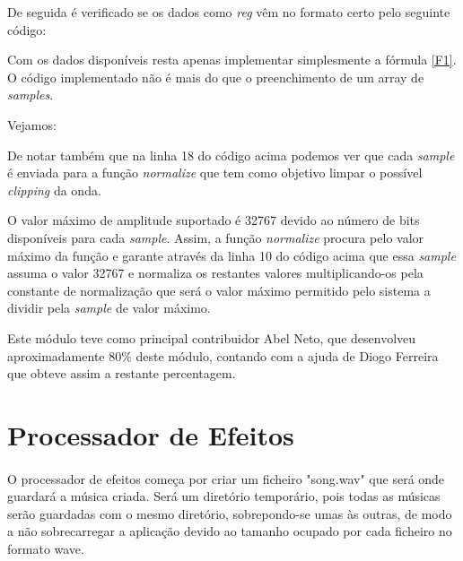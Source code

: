 \documentclass[11pt,openany,twoside]{report}
\begin{document}
De seguida é verificado se os dados como \textit{reg} vêm no formato certo pelo seguinte código:


Com os dados disponíveis resta apenas implementar simplesmente a fórmula \ref{F1}. O código implementado não é mais do que o preenchimento de um array de \textit{samples}. 

Vejamos:


De notar também que na linha 18 do código acima podemos ver que cada \textit{sample} é enviada para a função \textit{normalize} que tem como objetivo limpar o possível \textit{clipping} da onda.


O valor máximo de amplitude suportado é 32767 devido ao número de bits disponíveis para cada \textit{sample}. Assim, a função \textit{normalize} procura pelo valor máximo da função e garante através da linha 10 do código acima que essa \textit{sample} assuma o valor 32767 e normaliza os restantes valores multiplicando-os pela constante de normalização que será o valor máximo permitido pelo sistema a dividir pela \textit{sample} de valor máximo.

Este módulo teve como principal contribuidor Abel Neto, que desenvolveu aproximadamente 80\% deste módulo, contando com a ajuda de Diogo Ferreira que obteve assim a restante percentagem.

\section{Processador de Efeitos}
\paragraph{ } O processador de efeitos começa por criar um ficheiro "song.wav" que será onde guardará a música criada. Será um diretório temporário, pois todas as músicas serão guardadas com o mesmo diretório, sobrepondo-se umas às outras, de modo a não sobrecarregar a aplicação devido ao tamanho ocupado por cada ficheiro no formato \acs{wave}.
\end{document}
